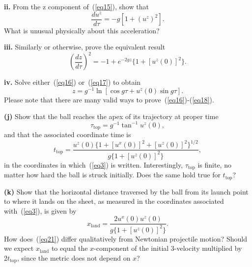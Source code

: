\documentclass[a4paper]{article} %
\begin{document}
\begin{framed}
\textbf{ii.} From the z component of~(\ref{eq15}), show that
\begin{equation}
\frac{du^z}{d\tau}=-g[1+(u^z)^2].\label{eq16}
\end{equation}
What is unusual physically about this acceleration?
\end{framed}

\begin{framed}
\textbf{iii.} Similarly or otherwise, prove the equivalent result
\begin{equation}
\left(\frac{dz}{d\tau}\right)^2=-1+e^{-2gz}\{1+[u^z(0)]^2\}.\label{eq17}
\end{equation}
\end{framed}

\begin{framed}
\textbf{iv.} Solve either~(\ref{eq16}) or~(\ref{eq17}) to obtain
\begin{equation}
z=g^{-1}\ln[\cos g\tau+u^z(0)\sin g\tau].\label{eq18}
\end{equation}
Please note that there are many valid ways to prove~(\ref{eq16})-(\ref{eq18}).
\end{framed}

\begin{framed}
\textbf{(j)} Show that the ball reaches the apex of its trajectory at proper time
\begin{equation}
\tau_{\text{top}}=g^{-1}\tan^{-1}u^z(0),
\end{equation}
and that the associated coordinate time is
\begin{equation}
t_{\text{top}}=\frac{u^z(0)\{1+[u^x(0)]^2+[u^z(0)]^2\}^{1/2}}{g\{1+[u^z(0)]^2\}},
\end{equation}
in the coordinates in which~(\ref{eq3}) is written. Interestingly, $\tau_{\text{top}}$ is finite, no matter
how hard the ball is struck initially. Does the same hold true for $t_{\text{top}}$?
\end{framed}

\begin{framed}
\textbf{(k)} Show that the horizontal distance traversed by the ball from its launch point to where it lands on the sheet, as measured in the coordinates associated with~(\ref{eq3}), is given by
\begin{equation}
x_{\text{land}}=\frac{2u^x(0)u^z(0)}{g\{1+[u^z(0)]^2\}}.\label{eq21}
\end{equation}
How does~(\ref{eq21}) differ qualitatively from Newtonian projectile motion? Should we expect $x_{\text{land}}$ to equal the $x$-component of the initial 3-velocity multiplied by $2t_{\text{top}}$,
since the metric does not depend on $x$?
\end{framed}
\end{document}
